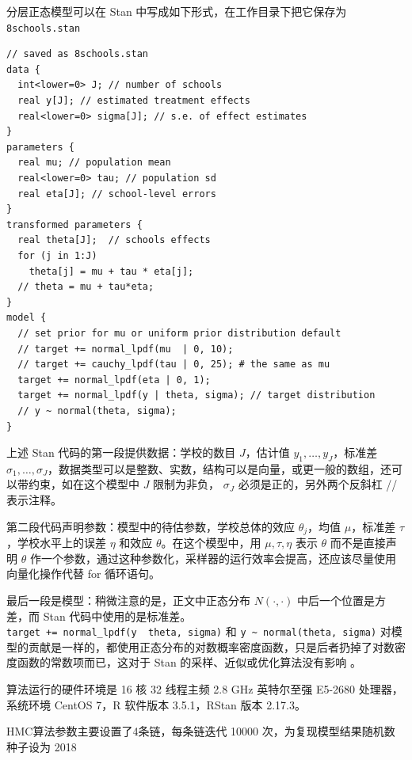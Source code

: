 \documentclass[12pt,a4paper,UTF8,twoside]{book}
\theoremstyle{definition}
\theoremstyle{definition}
\theoremstyle{definition}
\theoremstyle{remark}
\begin{document}
分层正态模型可以在 Stan 中写成如下形式，在工作目录下把它保存为
\texttt{8schools.stan}

\begin{verbatim}
// saved as 8schools.stan
data {
  int<lower=0> J; // number of schools 
  real y[J]; // estimated treatment effects
  real<lower=0> sigma[J]; // s.e. of effect estimates 
}
parameters {
  real mu; // population mean
  real<lower=0> tau; // population sd
  real eta[J]; // school-level errors
}
transformed parameters {
  real theta[J];  // schools effects
  for (j in 1:J)
    theta[j] = mu + tau * eta[j];
  // theta = mu + tau*eta;
}
model {
  // set prior for mu or uniform prior distribution default
  // target += normal_lpdf(mu  | 0, 10); 
  // target += cauchy_lpdf(tau | 0, 25); # the same as mu
  target += normal_lpdf(eta | 0, 1);
  target += normal_lpdf(y | theta, sigma); // target distribution
  // y ~ normal(theta, sigma);
}
\end{verbatim}

上述 Stan 代码的第一段提供数据：学校的数目 \(J\)，估计值
\(y_1,\ldots,y_{J}\)，标准差
\(\sigma_1,\ldots,\sigma_{J}\)，数据类型可以是整数、实数，结构可以是向量，或更一般的数组，还可以带约束，如在这个模型中
\(J\) 限制为非负， \(\sigma_{J}\) 必须是正的，另外两个反斜杠 //
表示注释。

第二段代码声明参数：模型中的待估参数，学校总体的效应 \(\theta_j\)，均值
\(\mu\)，标准差 \(\tau\)，学校水平上的误差 \(\eta\) 和效应
\(\theta\)。在这个模型中，用 \(\mu,\tau,\eta\) 表示 \(\theta\)
而不是直接声明 \(\theta\)
作一个参数，通过这种参数化，采样器的运行效率会提高，还应该尽量使用向量化操作代替
for 循环语句。

最后一段是模型：稍微注意的是，正文中正态分布 \(N(\cdot,\cdot)\)
中后一个位置是方差，而 Stan
代码中使用的是标准差。\texttt{target\ +=\ normal\_lpdf(y\ \textbar{}\ theta,\ sigma)}
和 \texttt{y\ \textasciitilde{}\ normal(theta,\ sigma)}
对模型的贡献是一样的，都使用正态分布的对数概率密度函数，只是后者扔掉了对数密度函数的常数项而已，这对于
Stan 的采样、近似或优化算法没有影响 \citep{Stan2017JSS}。

算法运行的硬件环境是 16 核 32 线程主频 2.8 GHz 英特尔至强 E5-2680
处理器，系统环境 CentOS 7，R 软件版本 3.5.1，RStan 版本 2.17.3。

HMC算法参数主要设置了4条链，每条链迭代 10000
次，为复现模型结果随机数种子设为 2018
\end{document}
